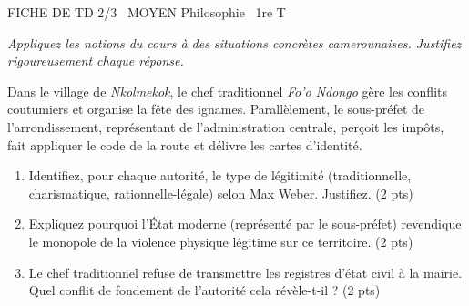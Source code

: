 \documentclass[11pt]{article}
\begin{document}
\begin{tcolorbox}[enhanced,colback=popink,colframe=popink,arc=10pt,boxrule=0pt,left=12pt,right=12pt,top=9pt,bottom=9pt]
{\color{white}\popxbold\small FICHE DE TD 2/3 \textbullet\ MOYEN \hfill Philosophie \textbullet\ 1re T\par}
\end{tcolorbox}
\vspace{4pt}
\emph{Appliquez les notions du cours à des situations concrètes camerounaises. Justifiez rigoureusement chaque réponse.}

\begin{exercice}
Dans le village de \textit{Nkolmekok}, le chef traditionnel \textit{Fo'o Ndongo} gère les conflits coutumiers et organise la fête des ignames. Parallèlement, le sous-préfet de l'arrondissement, représentant de l'administration centrale, perçoit les impôts, fait appliquer le code de la route et délivre les cartes d'identité.
\begin{enumerate}
    \item Identifiez, pour chaque autorité, le type de légitimité (traditionnelle, charismatique, rationnelle-légale) selon Max Weber. Justifiez. (2 pts)
    \item Expliquez pourquoi l'État moderne (représenté par le sous-préfet) revendique le monopole de la violence physique légitime sur ce territoire. (2 pts)
    \item Le chef traditionnel refuse de transmettre les registres d'état civil à la mairie. Quel conflit de fondement de l'autorité cela révèle-t-il ? (2 pts)
\end{enumerate}
\end{exercice}
\end{document}
